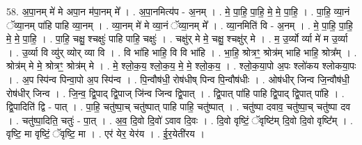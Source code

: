 \documentclass[17pt]{extarticle}
\begin{document}
58. अ॒पा॒नम् मे॑ मे अपा॒न म॑पा॒नम् मे᳚ । . अ॒पा॒नमित्य॑प - अ॒नम् । . मे॒ पा॒हि॒ पा॒हि॒ मे॒ मे॒ पा॒हि॒ । . पा॒हि॒ व्या॒नं ॅव्या॒नम् पा॑हि पाहि व्या॒नम् । . व्या॒नम् मे॑ मे व्या॒नं ॅव्या॒नम् मे᳚ । . व्या॒नमिति॑ वि - अ॒नम् । . मे॒ पा॒हि॒ पा॒हि॒ मे॒ मे॒ पा॒हि॒ । . पा॒हि॒ चक्षु॒ श्चक्षुः॑ पाहि पाहि॒ चक्षुः॑ । . चक्षु॑र् मे मे॒ चक्षु॒ श्चक्षु॑र् मे । . म॒ उ॒र्व्यो र्व्या मे॑ म उ॒र्व्या । . उ॒र्व्या वि व्यु॑र् व्योर् व्या वि । . वि भा॑हि भाहि॒ वि वि भा॑हि । . भा॒हि॒ श्रोत्रꣳ॒॒ श्रोत्र॑म् भाहि भाहि॒ श्रोत्र᳚म् । . श्रोत्र॑म् मे मे॒ श्रोत्रꣳ॒॒ श्रोत्र॑म् मे । . मे॒ श्लो॒क॒य॒ श्लो॒क॒य॒ मे॒ मे॒ श्लो॒क॒य॒ । . श्लो॒क॒या॒पो अ॒पः श्लो॑कय श्लोकया॒पः । . अ॒प स्पि॑न्व पिन्वा॒पो अ॒प स्पि॑न्व । . पि॒न्वौष॑धी॒ रोष॑धीष् पिन्व पि॒न्वौष॑धीः । . ओष॑धीर् जिन्व जि॒न्वौष॑धी॒ रोष॑धीर् जिन्व । . जि॒न्व॒ द्वि॒पाद् द्वि॒पाज् जि॑न्व जिन्व द्वि॒पात् । . द्वि॒पात् पा॑हि पाहि द्वि॒पाद् द्वि॒पात् पा॑हि । . द्वि॒पादिति॑ द्वि - पात् । . पा॒हि॒ चतु॑ष्पा॒च् चतु॑ष्पात् पाहि पाहि॒ चतु॑ष्पात् । . चतु॑ष्पा दवाव॒ चतु॑ष्पा॒च् चतु॑ष्पा दव । . चतु॑ष्पा॒दिति॒ चतुः॑ - पा॒त् । . अ॒व॒ दि॒वो दि॒वो॑ ऽवाव दि॒वः । . दि॒वो वृष्टिं॒ ॅवृष्टि॑म् दि॒वो दि॒वो वृष्टि᳚म् । . वृष्टि॒ मा वृष्टिं॒ ॅवृष्टि॒ मा । . एर॑ येर॒ येर॑य । . ई॒र॒येती॑रय । \newline
\end{document}
